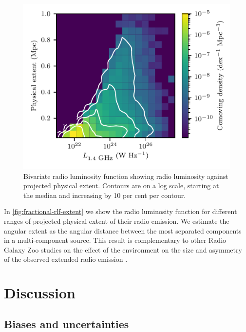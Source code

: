 \documentclass[11pt, a4paper]{book}
\begin{document}
      \begin{figure}
          \centering
        \includegraphics{rlf-images/physical-extent.pdf}
        \caption[Bivariate radio luminosity function showing radio luminosity against projected physical extent.]{Bivariate radio luminosity function showing radio luminosity against projected physical extent. Contours are on a log scale, starting at the median and increasing by 10 per cent per contour.
        \label{fig:fractional-rlf-extent}}
      \end{figure}

      In \autoref{fig:fractional-rlf-extent} we show the radio luminosity
      function for different ranges of projected physical extent of their radio emission. We estimate the angular extent as the angular distance between the most separated components in a multi-component source. This result is complementary to other Radio Galaxy Zoo studies on the effect of the environment on the size and asymmetry of the observed extended radio emission \citep{rodman19asymmetry,garon19bending}.


\section{Discussion}\label{sec:rlfs-discussion}

  \subsection{Biases and uncertainties}
    \label{sec:rlfs-bias}
\end{document}
